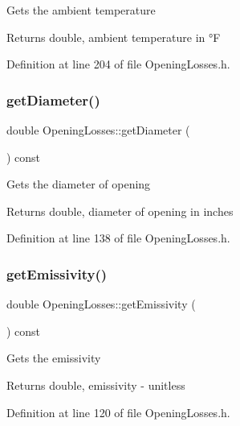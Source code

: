 Gets the ambient temperature \begin{DoxyReturn}{Returns}
double, ambient temperature in °F 
\end{DoxyReturn}


Definition at line 204 of file Opening\+Losses.\+h.

\mbox{\label{class_opening_losses_a8ed643300b0f5b606be6cd669cd413c3}} 
\subsubsection{\texorpdfstring{get\+Diameter()}{getDiameter()}}
{\footnotesize\ttfamily double Opening\+Losses\+::get\+Diameter (\begin{DoxyParamCaption}{ }\end{DoxyParamCaption}) const\hspace{0.3cm}{\ttfamily [inline]}}

Gets the diameter of opening \begin{DoxyReturn}{Returns}
double, diameter of opening in inches 
\end{DoxyReturn}


Definition at line 138 of file Opening\+Losses.\+h.

\mbox{\label{class_opening_losses_a7eaf8e68f268e8ff1671c5f9f0462b4f}} 
\subsubsection{\texorpdfstring{get\+Emissivity()}{getEmissivity()}}
{\footnotesize\ttfamily double Opening\+Losses\+::get\+Emissivity (\begin{DoxyParamCaption}{ }\end{DoxyParamCaption}) const\hspace{0.3cm}{\ttfamily [inline]}}

Gets the emissivity \begin{DoxyReturn}{Returns}
double, emissivity -\/ unitless 
\end{DoxyReturn}


Definition at line 120 of file Opening\+Losses.\+h.

